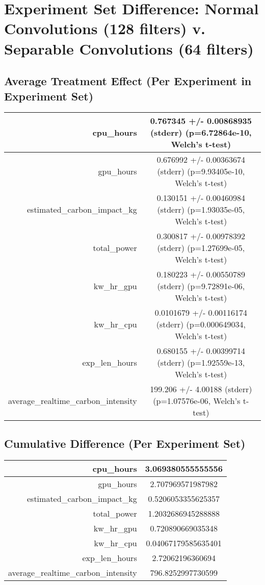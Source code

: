 \documentclass{article}%
\begin{document}
%
\normalsize%
\section{Experiment Set Difference: Normal Convolutions (128 filters) v. Separable Convolutions (64 filters)}%
\label{sec:Experiment Set Difference Normal Convolutions (128 filters) v. Separable Convolutions (64 filters)}%
\subsection{Average Treatment Effect (Per Experiment in Experiment Set)}%
\label{subsec:Average Treatment Effect (Per Experiment in Experiment Set)}%
\begin{tabular}{|r|c|}%
\hline%
cpu\_hours&0.767345 +/{-} 0.00868935 (stderr) (p=6.72864e{-}10, Welch's t{-}test)\\%
\hline%
gpu\_hours&0.676992 +/{-} 0.00363674 (stderr) (p=9.93405e{-}10, Welch's t{-}test)\\%
\hline%
estimated\_carbon\_impact\_kg&0.130151 +/{-} 0.00460984 (stderr) (p=1.93035e{-}05, Welch's t{-}test)\\%
\hline%
total\_power&0.300817 +/{-} 0.00978392 (stderr) (p=1.27699e{-}05, Welch's t{-}test)\\%
\hline%
kw\_hr\_gpu&0.180223 +/{-} 0.00550789 (stderr) (p=9.72891e{-}06, Welch's t{-}test)\\%
\hline%
kw\_hr\_cpu&0.0101679 +/{-} 0.00116174 (stderr) (p=0.000649034, Welch's t{-}test)\\%
\hline%
exp\_len\_hours&0.680155 +/{-} 0.00399714 (stderr) (p=1.92559e{-}13, Welch's t{-}test)\\%
\hline%
average\_realtime\_carbon\_intensity&199.206 +/{-} 4.00188 (stderr) (p=1.07576e{-}06, Welch's t{-}test)\\%
\hline%
\end{tabular}

%
\subsection{Cumulative Difference (Per Experiment Set)}%
\label{subsec:Cumulative Difference (Per Experiment Set)}%
\begin{tabular}{|r|c|}%
\hline%
cpu\_hours&3.069380555555556\\%
\hline%
gpu\_hours&2.707969571987982\\%
\hline%
estimated\_carbon\_impact\_kg&0.5206053355625357\\%
\hline%
total\_power&1.2032686945288888\\%
\hline%
kw\_hr\_gpu&0.720890669035348\\%
\hline%
kw\_hr\_cpu&0.04067179585635401\\%
\hline%
exp\_len\_hours&2.72062196360694\\%
\hline%
average\_realtime\_carbon\_intensity&796.8252997730599\\%
\hline%
\end{tabular}

%
\end{document}
